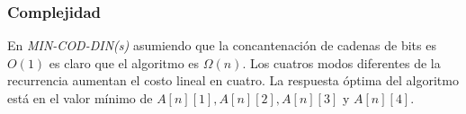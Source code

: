\subsubsection{Complejidad}

En \emph{MIN-COD-DIN(s)} asumiendo que la concantenación de cadenas de bits es $O(1)$ es claro que el algoritmo es $\Omega(n)$. 
Los cuatros modos diferentes de la recurrencia aumentan el costo lineal en cuatro. La respuesta óptima del algoritmo está
en el valor mínimo de $A[n][1], A[n][2], A[n][3]$ y $A[n][4]$.

